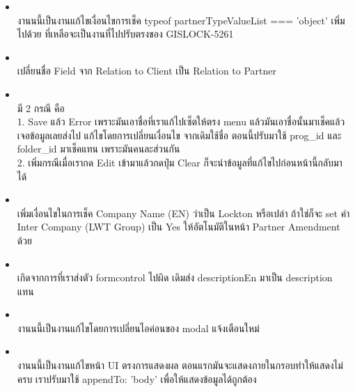 \begin{itemize}
    \item \textbf{} \\
          งานนนี้เป็นงานแก้ไขเงื่อนไขการเช็ค typeof partnerTypeValueList === 'object' เพิ่มไปด้วย ที่เหลือจะเป็นงานที่ไปปรับตรงของ GISLOCK-5261 
    \item \textbf{} \\
          เปลี่ยนชื่อ Field จาก Relation to Client เป็น Relation to Partner
    \item \textbf{} \\
          มี 2 กรณี คือ \\
          1. Save แล้ว Error เพราะมันเอาชื่อที่เราแก้ไปเซ็ตให้ตรง menu แล้วมันเอาชื่อนั้นมาเช็คแล้วเจอข้อมูลเลยส่งไป แก้ไขโดยการเปลี่ยนเงื่อนไข จากเดิมใช้ชื่อ ตอนนี้ปรับมาใช้ prog\_id และ folder\_id มาเช็คแทน เพราะมันคนละส่วนกัน \\ 
          2. เพิ่มกรณีเมื่อเรากด Edit เข้ามาแล้วกดปุ่ม Clear ก็จะนำข้อมูลที่แก้ไขไปก่อนหน้านี้กลับมาได้
    \item \textbf{} \\
          เพิ่มเงื่อนไขในการเช็ค Company Name (EN) ว่าเป็น Lockton หรือเปล่า ถ้าใช่ก็จะ set ค่า Inter Company (LWT Group) เป็น Yes ให้อัตโนมัติในหน้า Partner Amendment ด้วย
    \item \textbf{} \\
          เกิดจากการที่เราส่งตัว formcontrol ไปผิด เดิมส่ง descriptionEn มาเป็น description แทน
    \item \textbf{} \\
          งานนนี้เป็นงานแก้ไขโดยการเปลี่ยนไอค่อนของ modal แจ้งเตือนใหม่
    \item \textbf{} \\
          งานนนี้เป็นงานแก้ไขหน้า UI ตรงการแสดงผล ตอนแรกมันจะแสดงภายในกรอบทำให้แสดงไม่ครบ เราปรับมาใช้ appendTo: 'body' เพื่อให้แสดงข้อมูลได้ถูกต้อง

\end{itemize}

